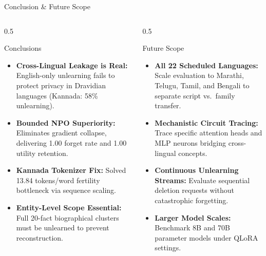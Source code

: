 \documentclass[aspectratio=169,10pt]{beamer}
\begin{document}
\begin{frame}{Conclusion \& Future Scope}
  \begin{columns}[T]
    \begin{column}{0.5\textwidth}
      \begin{block}{Conclusions}
        \begin{itemize}\scriptsize
          \item \textbf{Cross-Lingual Leakage is Real:} English-only unlearning fails to protect privacy in Dravidian languages (Kannada: 58\% unlearning).
          \item \textbf{Bounded NPO Superiority:} Eliminates gradient collapse, delivering 1.00 forget rate and 1.00 utility retention.
          \item \textbf{Kannada Tokenizer Fix:} Solved 13.84 tokens/word fertility bottleneck via sequence scaling.
          \item \textbf{Entity-Level Scope Essential:} Full 20-fact biographical clusters must be unlearned to prevent reconstruction.
        \end{itemize}
      \end{block}
    \end{column}
    \begin{column}{0.5\textwidth}
      \begin{exampleblock}{Future Scope}
        \begin{itemize}\scriptsize
          \item \textbf{All 22 Scheduled Languages:} Scale evaluation to Marathi, Telugu, Tamil, and Bengali to separate script vs.\ family transfer.
          \item \textbf{Mechanistic Circuit Tracing:} Trace specific attention heads and MLP neurons bridging cross-lingual concepts.
          \item \textbf{Continuous Unlearning Streams:} Evaluate sequential deletion requests without catastrophic forgetting.
          \item \textbf{Larger Model Scales:} Benchmark 8B and 70B parameter models under QLoRA settings.
        \end{itemize}
      \end{exampleblock}
    \end{column}
  \end{columns}
\end{frame}
\end{document}
